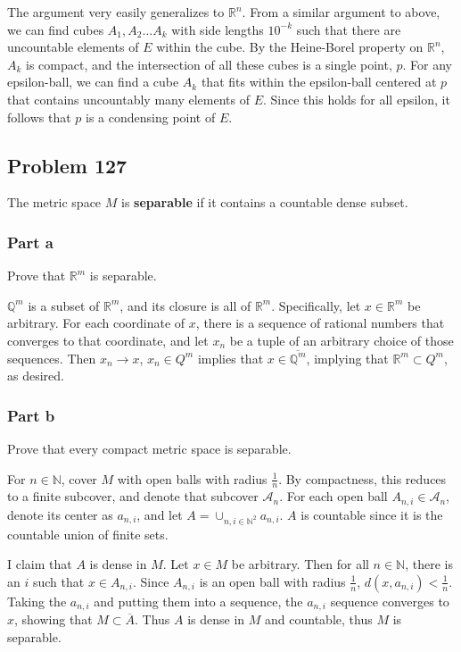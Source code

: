 \documentclass{article}
\newcommand{\N}{\mathbb{N}}
\newcommand{\Q}{\mathbb{Q}}
\newcommand{\R}{\mathbb{R}}
\newcommand{\A}{\mathcal{A}}
\begin{document}
The argument very easily generalizes to $\R^n$. From a similar argument to above, we can find cubes $A_1, A_2 \dots A_k$ with side lengths $10^{-k}$ such that there are uncountable elements of $E$ within the cube. By the Heine-Borel property on $\R^n$, $A_k$ is compact, and the intersection of all these cubes is a single point, $p$. For any epsilon-ball, we can find a cube $A_k$ that fits within the epsilon-ball centered at $p$ that contains uncountably many elements of $E$. Since this holds for all epsilon, it follows that $p$ is a condensing point of $E$.

\subsection*{Problem 127}

The metric space $M$ is \textbf{separable} if it contains a countable dense subset.

\subsubsection*{Part a}

Prove that $\R^m$ is separable.

$\Q^m$ is a subset of $\R^m$, and its closure is all of $\R^m$. Specifically, let $x \in \R^m$ be arbitrary. For each coordinate of $x$, there is a sequence of rational numbers that converges to that coordinate, and let $x_n$ be a tuple of an arbitrary choice of those sequences. Then $x_n \rightarrow x$, $x_n \in Q^m$ implies that $x \in \overline{\Q^m}$, implying that $\R^m \subset Q^m$, as desired.

\subsubsection*{Part b}

Prove that every compact metric space is separable.

For $n \in \N$, cover $M$ with open balls with radius $\frac{1}{n}$. By compactness, this reduces to a finite subcover, and denote that subcover $\A_n$. For each open ball $A_{n, i} \in \A_n$, denote its center as $a_{n, i}$, and let $A = \cup_{n, i \in \N^2} a_{n, i}$. $A$ is countable since it is the countable union of finite sets.

I claim that $A$ is dense in $M$. Let $x \in M$ be arbitrary. Then for all $n \in \N$, there is an $i$ such that $x \in A_{n, i}$. Since $A_{n,i}$ is an open ball with radius $\frac{1}{n}$, $d(x, a_{n, i}) < \frac{1}{n}$. Taking the $a_{n, i}$ and putting them into a sequence, the $a_{n,i}$ sequence converges to $x$, showing that $M \subset \overline{A}$. Thus $A$ is dense in $M$ and countable, thus $M$ is separable.
\end{document}
